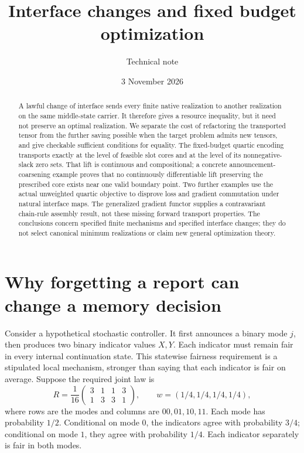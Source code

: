 \documentclass[11pt]{article}
\title{Interface changes and fixed budget optimization}
\author{Technical note}
\date{3 November 2026}
\theoremstyle{remark}
\begin{document}
\maketitle
\begin{abstract}
A lawful change of interface sends every finite native realization to another realization on the same middle-state carrier. It therefore gives a resource inequality, but it need not preserve an optimal realization. We separate the cost of refactoring the transported tensor from the further saving possible when the target problem admits new tensors, and give checkable sufficient conditions for equality. The fixed-budget quartic encoding transports exactly at the level of feasible slot cores and at the level of its nonnegative-slack zero sets. That lift is continuous and compositional; a concrete announcement-coarsening example proves that no continuously differentiable lift preserving the prescribed core exists near one valid boundary point. Two further examples use the actual unweighted quartic objective to disprove loss and gradient commutation under natural interface maps. The generalized gradient functor supplies a contravariant chain-rule assembly result, not these missing forward transport properties. The conclusions concern specified finite mechanisms and specified interface changes; they do not select canonical minimum realizations or claim new general optimization theory.
\end{abstract}

\section{Why forgetting a report can change a memory decision}\label{sec:motivation}
Consider a hypothetical stochastic controller. It first announces a binary mode $j$, then produces two binary indicator values $X,Y$. Each indicator must remain fair in every internal continuation state. This statewise fairness requirement is a stipulated local mechanism, stronger than saying that each indicator is fair on average. Suppose the required joint law is
\begin{equation}\label{eq:binary-full}
 R=\frac1{16}\begin{pmatrix}3&1&1&3\\1&3&3&1\end{pmatrix},
 \qquad w=(1/4,1/4,1/4,1/4),
\end{equation}
where rows are the modes and columns are $00,01,10,11$. Each mode has probability $1/2$. Conditional on mode $0$, the indicators agree with probability $3/4$; conditional on mode $1$, they agree with probability $1/4$. Each indicator separately is fair in both modes.
\end{document}
